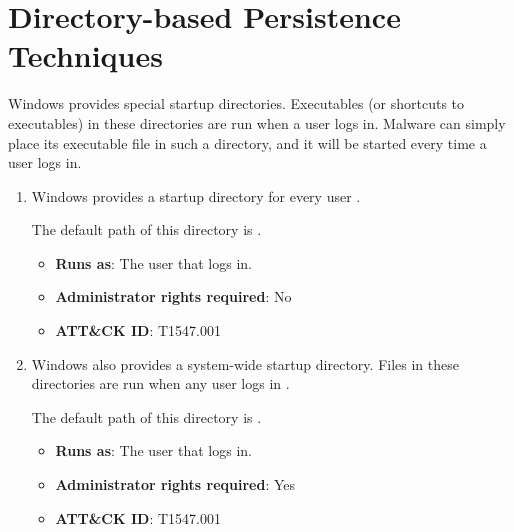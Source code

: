 \section{Directory-based Persistence Techniques}\label{section:directory-based persistence}
Windows provides special startup directories. Executables (or shortcuts to executables) in these directories are run when a user logs in. Malware can simply place its executable file in such a directory, and it will be started every time a user logs in.

\begin{enumerate}[label={\textbf{DP\arabic*}:}, ref=DP\arabic*, start=0]
    \item \label{DP0} Windows provides a startup directory for every user \cite{f-secure-persistence}.

    The default path of this directory is .

    \begin{itemize}[label={}, leftmargin=*]
        \item \textbf{Runs as}: The user that logs in.
        \item \textbf{Administrator rights required}: No
        \item \textbf{ATT\&CK ID}: T1547.001
    \end{itemize}

    \item \label{DP1} Windows also provides a system-wide startup directory. Files in these directories are run when any user logs in \cite{f-secure-persistence}.

    The default path of this directory is .

    \begin{itemize}[label={}, leftmargin=*]
        \item \textbf{Runs as}: The user that logs in.
        \item \textbf{Administrator rights required}: Yes
        \item \textbf{ATT\&CK ID}: T1547.001
    \end{itemize}
\end{enumerate}
